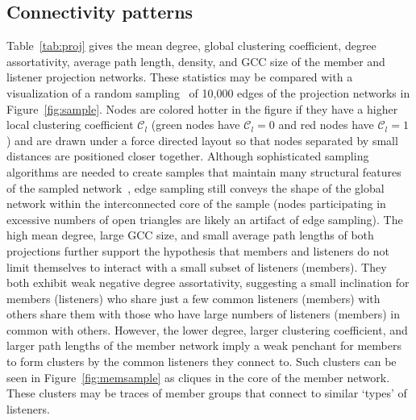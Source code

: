 \subsection{Connectivity patterns}
Table~\ref{tab:proj} gives the mean degree, global clustering coefficient, degree assortativity, average path length, 
density, and GCC size of the member and listener projection networks. 
These statistics may be compared with a visualization of a random sampling~\cite{ahmed2014network} of 
10,000 edges of the projection networks in Figure~\ref{fig:sample}. 
Nodes are colored hotter in the figure if they 
have a higher local clustering coefficient $\mathcal{C}_l$ 
(green nodes have $\mathcal{C}_l = 0$ and red nodes have $\mathcal{C}_l = 1$) 
and are 
drawn under a force directed layout so that nodes separated by small
distances are positioned closer together. 
Although sophisticated sampling algorithms are needed to create samples that maintain many
structural features of the sampled network~\cite{doran2014triad}, edge sampling still conveys the shape
of the global network within the interconnected core of the sample
(nodes participating in excessive numbers of open triangles are likely an artifact
of edge sampling).  
The high mean degree, large GCC size, and small average path lengths of both projections further
support the hypothesis that members and listeners do not limit themselves to interact 
with a small subset of listeners (members). They both exhibit weak negative degree 
assortativity, suggesting a small inclination
for members (listeners) who share just a few common listeners (members) with others share
them with those who have large numbers of listeners (members) in common with others.
However, the lower degree, larger clustering
coefficient, and larger path lengths of the member network imply a weak penchant for members 
to form clusters by the common listeners they connect to. Such clusters
can be seen in Figure~\ref{fig:memsample} as cliques in the core of 
the member network. 
These clusters may be traces of member groups that connect to similar `types' of listeners. 
